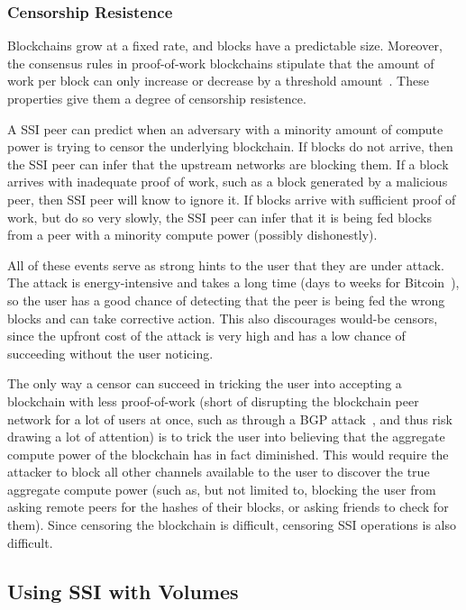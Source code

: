 \subsubsection{Censorship Resistence}

Blockchains grow at a fixed rate, and blocks have a predictable size.  Moreover,
the consensus rules in proof-of-work blockchains stipulate that 
the amount of work per block can only increase or decrease by a threshold
amount~\cite{bitcoin-difficulty-adjustment-rules}.  These properties give them a
degree of censorship resistence.

A SSI peer can predict when an adversary with a minority amount of compute power
is trying to censor the underlying blockchain.  If
blocks do not arrive, then the SSI peer can infer that the upstream
networks are blocking them.  If a block arrives with inadequate proof of work,
such as a block generated by a malicious peer, then SSI peer will know to ignore
it.  If blocks arrive with sufficient proof of work, but do so very slowly, the
SSI peer can infer that it is being fed blocks from a peer with a minority
compute power (possibly dishonestly).

All of these events serve as strong hints to the user that they are under
attack.  The attack is energy-intensive and takes a long time (days to weeks for
Bitcoin~\cite{bitcoin-difficulty-adjustment-rules}),
so the user has a good chance of detecting that the peer is being fed the wrong
blocks and can take corrective action.  This also discourages would-be censors,
since the upfront cost of the attack is very high and has a low chance of
succeeding without the user noticing.

The only way a censor can succeed in tricking the user into accepting a
blockchain with less proof-of-work (short of disrupting the blockchain peer network for a lot of
users at once, such as through a BGP attack~\cite{bitcoin-bgp-attack}, and thus
risk drawing a lot of attention)
is to trick the user into believing that the aggregate compute
power of the blockchain has in fact diminished.  This would require the attacker
to block all other channels available to the user to discover the true aggregate
compute power (such as, but not limited to, blocking the user from asking remote
peers for the hashes of their blocks, or asking friends to check for them).
Since censoring the blockchain is difficult, censoring SSI operations is also
difficult.

\subsection{Using SSI with Volumes}

